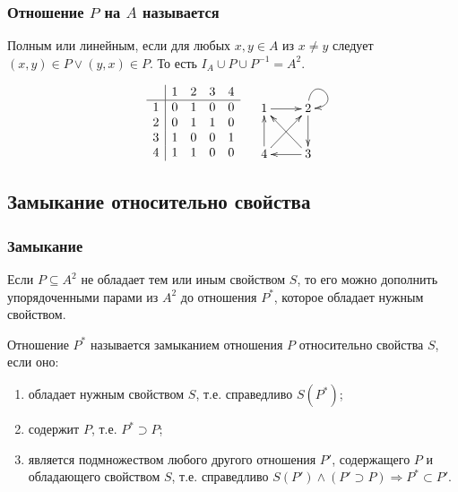 \begin{frame}
    \frametitle{Отношение $P$ на $A$ называется}
    
    \begin{definition}
        \alert{Полным} или \alert{линейным}, если для любых $x,y\in A$ из $x\neq y$ следует $(x,y)\in P\lor (y,x)\in P$. То есть $I_A\cup P\cup P^{-1}=A^2$.
    \end{definition}
    \[  
        \begin{matrix}
            \begin{array}{c|cccc}
                 &1&2&3&4 \\ \hline
                1&0&1&0&0 \\
                2&0&1&1&0 \\
                3&1&0&0&1 \\
                4&1&1&0&0
            \end{array}
            &\raisebox{2\height}{
                {\xymatrix{
                    1 \ar@{->}[r] 
                        &2 \ar@{->}[d] \ar@{->}@(u,r)[]
                            \\
                    4 \ar@{->}[u] \ar@{->}[ur] 
                        &3 \ar@{->}[l] \ar@{->}[ul] 
                }}
            }
        \end{matrix}
    \]    
\end{frame}


\subsection{Замыкание относительно свойства} 

\begin{frame}
    \frametitle{Замыкание}
    
    Если $P\subseteq A^2$ не обладает тем или иным свойством $S$, то его можно дополнить упорядоченными парами из $A^2$ до отношения $P^*$, которое обладает нужным свойством. 

    \begin{definition}
        Отношение $P^*$ называется \alert{замыканием} отношения $P$ \alert{относительно свойства} $S$, если оно:
        \begin{enumerate}
            \item обладает нужным свойством $S$, т.е. справедливо $S(P^*)$;
            \item содержит $P$, т.е. $P^*\supset P$;
            \item является подмножеством любого другого отношения $P'$, содержащего $P$ и обладающего свойством $S$, т.е. справедливо $S(P')\land (P'\supset P)\Rightarrow P^*\subset P'$.
        \end{enumerate}
    \end{definition}
\end{frame}

